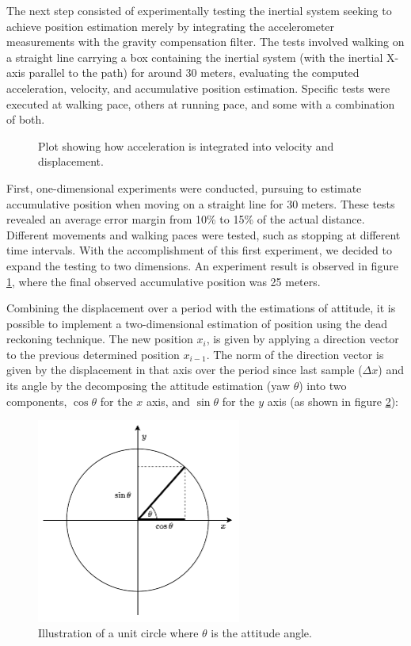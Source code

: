 The next step consisted of experimentally testing the inertial system seeking to achieve position estimation merely by integrating the accelerometer measurements with the gravity compensation filter. The tests involved walking on a straight line carrying a box containing the inertial system (with the inertial X-axis parallel to the path) for around 30 meters, evaluating the computed acceleration, velocity, and accumulative position estimation. Specific tests were executed at walking pace, others at running pace, and some with a combination of both.

\begin{figure}[!h]
    \centering
    \resizebox{0.8\linewidth}{!}{}
    \caption{ Plot showing how acceleration is integrated into velocity and displacement. }
    \label{fig:integration}
\end{figure}

First, one-dimensional experiments were conducted, pursuing to estimate accumulative position when moving on a straight line for 30 meters. These tests revealed an average error margin from 10\% to 15\% of the actual distance. Different movements and walking paces were tested, such as stopping at different time intervals. With the accomplishment of this first experiment, we decided to expand the testing to two dimensions. An experiment result is observed in figure \ref{fig:integration}, where the final observed accumulative position was 25 meters.

Combining the displacement over a period with the estimations of attitude, it is possible to implement a two-dimensional estimation of position using the dead reckoning technique. The new position $x_i$, is given by applying a direction vector to the previous determined position $x_{i-1}$. The norm of the direction vector is given by the displacement in that axis over the period since last sample ($\Delta x$) and its angle by the decomposing the attitude estimation (yaw $\theta$) into two components, $\cos \theta$ for the $x$ axis, and $\sin \theta$ for the $y$ axis (as shown in figure \ref{fig:trignometric}):

\begin{figure}[!h]
    \centering
    \includegraphics[width=0.6\textwidth]{figures/trignometric.pdf}
    \caption{Illustration of a unit circle where $\theta$ is the attitude angle.}
    \label{fig:trignometric}
\end{figure}

